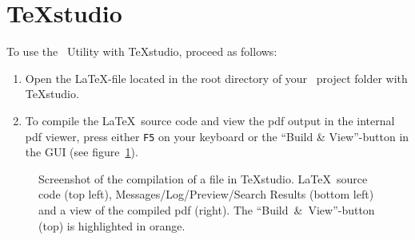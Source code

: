 	\newpage
	\section{TeXstudio}
		To use the \productName~Utility with TeXstudio, proceed as follows:
		\begin{enumerate}[label={\color{docartTurquoise}Step \arabic*:},leftmargin=*]
			\item Open the \LaTeX-file located in the root directory of your \productName~project folder with TeXstudio.
			\item To compile the \LaTeX~source code and view the pdf output in the internal pdf viewer,
			press either \lstinline{F5} on your keyboard or the \enquote{Build \& View}-button in the GUI (see \mbox{figure \ref{fig:usage:texstudio:compilation-screenshot}}).
		\end{enumerate}
		\begin{figure}[h!]
			\centering
			\caption{%
				Screenshot of the compilation of a file in TeXstudio. \LaTeX~source code (top left), \mbox{Messages}/Log/Preview/Search Results (bottom left)
				and a view of the compiled pdf (right). The \mbox{\enquote{Build \& View}-button} (top) is highlighted in orange.%
			}
			\label{fig:usage:texstudio:compilation-screenshot}
		\end{figure}
	
